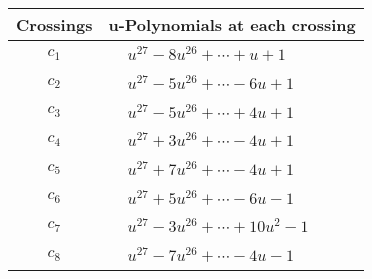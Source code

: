 \documentclass[1p]{elsarticle_modified}
\theoremstyle{definition}
\begin{document}
\begin{tabular}{m{50pt}|m{274pt}}
Crossings & \hspace{64pt}u-Polynomials at each crossing \\
\hline $$\begin{aligned}c_{1}\end{aligned}$$&$\begin{aligned}
&u^{27}-8 u^{26}+\cdots+u+1
\end{aligned}$\\
\hline $$\begin{aligned}c_{2}\end{aligned}$$&$\begin{aligned}
&u^{27}-5 u^{26}+\cdots-6 u+1
\end{aligned}$\\
\hline $$\begin{aligned}c_{3}\end{aligned}$$&$\begin{aligned}
&u^{27}-5 u^{26}+\cdots+4 u+1
\end{aligned}$\\
\hline $$\begin{aligned}c_{4}\end{aligned}$$&$\begin{aligned}
&u^{27}+3 u^{26}+\cdots-4 u+1
\end{aligned}$\\
\hline $$\begin{aligned}c_{5}\end{aligned}$$&$\begin{aligned}
&u^{27}+7 u^{26}+\cdots-4 u+1
\end{aligned}$\\
\hline $$\begin{aligned}c_{6}\end{aligned}$$&$\begin{aligned}
&u^{27}+5 u^{26}+\cdots-6 u-1
\end{aligned}$\\
\hline $$\begin{aligned}c_{7}\end{aligned}$$&$\begin{aligned}
&u^{27}-3 u^{26}+\cdots+10 u^2-1
\end{aligned}$\\
\hline $$\begin{aligned}c_{8}\end{aligned}$$&$\begin{aligned}
&u^{27}-7 u^{26}+\cdots-4 u-1
\end{aligned}$\\

\end{tabular}
\end{document}
